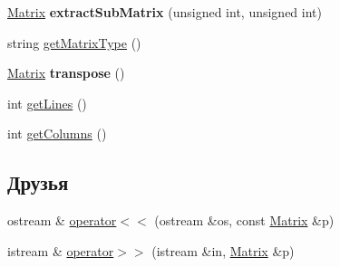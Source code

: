 \begin{DoxyCompactItemize}
\item 
\hypertarget{class_matrix_adc694bfade2852594a5ce3efcf17a616}{\hyperlink{class_matrix}{Matrix} {\bfseries extract\-Sub\-Matrix} (unsigned int, unsigned int)}\label{class_matrix_adc694bfade2852594a5ce3efcf17a616}

\item 
string \hyperlink{class_matrix_a171ca8f5a482ede4adc3a84d10f59da3}{get\-Matrix\-Type} ()
\item 
\hypertarget{class_matrix_ae23f817021383e3c8636a714dcba1d21}{\hyperlink{class_matrix}{Matrix} {\bfseries transpose} ()}\label{class_matrix_ae23f817021383e3c8636a714dcba1d21}

\item 
int \hyperlink{class_matrix_acc315708bcdb54795a686b91277f5bdf}{get\-Lines} ()
\item 
int \hyperlink{class_matrix_a324b4057cd6e2167687e406abd720020}{get\-Columns} ()
\end{DoxyCompactItemize}
\subsection*{Друзья}
\begin{DoxyCompactItemize}
\item 
ostream \& \hyperlink{class_matrix_aa8f4214bd22af7e40971a2614816063d}{operator$<$$<$} (ostream \&os, const \hyperlink{class_matrix}{Matrix} \&p)
\item 
istream \& \hyperlink{class_matrix_a4e914824d92c87ee5eb20abe65f35ff3}{operator$>$$>$} (istream \&in, \hyperlink{class_matrix}{Matrix} \&p)
\end{DoxyCompactItemize}


